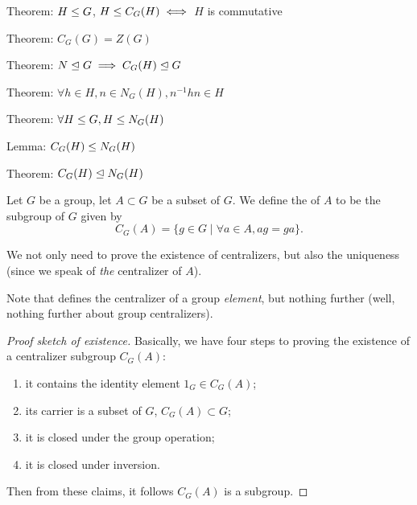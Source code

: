\LA{}Theorem: $H\leq G$, $H\leq C_{G}(H)\iff$ $H$ is commutative~{\nwtagstyle{}}\RA{}

\LA{}Theorem: $C_{G}(G)=Z(G)$~{\nwtagstyle{}}\RA{}

\LA{}Theorem: $N\trianglelefteq G\implies C_{G}(H)\trianglelefteq G$~{\nwtagstyle{}}\RA{}

\LA{}Theorem: $\forall h\in H,n\in N_{G}(H), n^{-1}hn\in H$~{\nwtagstyle{}}\RA{}

\LA{}Theorem: $\forall H\leq G, H\leq N_{G}(H)$~{\nwtagstyle{}}\RA{}

\LA{}Lemma: $C_{G}(H)\leq N_{G}(H)$~{\nwtagstyle{}}\RA{}

\LA{}Theorem: $C_{G}(H)\trianglelefteq N_{G}(H)$~{\nwtagstyle{}}\RA{}
\nwendcode{}\nwdocspar

\begin{definition}\label{defn:characteristic-subgroup:centralizer-of-subset}
  Let $G$ be a group, let $A\subset G$ be a subset of $G$.
  We define the  of $A$ to be the subgroup of $G$
  given by
  \begin{equation}
C_{G}(A) = \{g\in G\mid \forall a\in A, ag=ga\}.
  \end{equation}
\end{definition}

\begin{def-remark}
We not only need to prove the existence of centralizers, but also the
uniqueness (since we speak of \emph{the} centralizer of $A$).
\end{def-remark}
\begin{def-remark}
Note that  defines the centralizer of a group \emph{element},
but nothing further (well, nothing further about group centralizers).
\end{def-remark}

\begin{proof}[Proof sketch of existence]
Basically, we have four steps to proving the existence of a centralizer
subgroup $C_{G}(A)$:
\begin{enumerate}
\item it contains the identity element $1_{G}\in C_{G}(A)$;
\item its carrier is a subset of $G$, $C_{G}(A)\subset G$;
\item it is closed under the group operation;
\item it is closed under inversion.
\end{enumerate}
Then from these claims, it follows $C_{G}(A)$ is a subgroup.
\end{proof}

